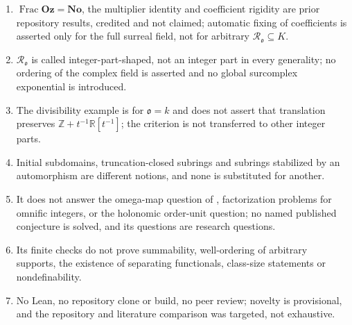 \documentclass[11pt,oneside]{article}
\numberwithin{equation}{section}
\theoremstyle{definition}
\theoremstyle{remark}
\newcommand{\No}{\mathbf{No}}
\newcommand{\Oz}{\mathbf{Oz}}
\newcommand{\R}{\mathbb R}
\newcommand{\Z}{\mathbb Z}
\newcommand{\oo}{\mathfrak o}
\newcommand{\Ro}{\mathcal R_{\oo}}
\newcommand{\Frac}{\operatorname{Frac}}
\begin{document}
\begin{enumerate}[itemsep=1pt]
\item $\Frac\Oz=\No$, the multiplier identity and coefficient rigidity are prior
repository results, credited and not claimed; automatic fixing of coefficients is
asserted only for the full surreal field, not for arbitrary $\Ro\subseteq K$.
\item $\Ro$ is called integer-part-shaped, not an integer part in every generality;
no ordering of the complex field is asserted and no global surcomplex exponential
is introduced.
\item The divisibility example is for $\oo=k$ and does not assert that translation
preserves $\Z+t^{-1}\R[t^{-1}]$; the criterion is not transferred to other integer
parts.
\item Initial subdomains, truncation-closed subrings and subrings stabilized by an
automorphism are different notions, and none is substituted for another.
\item It does not answer the omega-map question of \cite{KKS}, factorization problems
for omnific integers, or the holonomic order-unit question; no named published
conjecture is solved, and its questions are research questions.
\item Its finite checks do not prove summability, well-ordering of arbitrary supports,
the existence of separating functionals, class-size statements or
nondefinability.
\item No Lean, no repository clone or build, no peer review; novelty is provisional,
and the repository and literature comparison was targeted, not exhaustive.
\end{enumerate}
\end{document}
